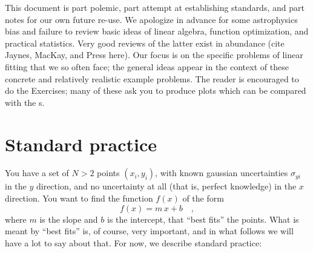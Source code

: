 \documentclass[12pt]{article}
\newcommand{\problemname}{Exercise}
\newcounter{problem}
\begin{document}
This document is part polemic, part attempt at establishing standards,
and part notes for our own future re-use.  We apologize in advance for
some astrophysics bias and failure to review basic ideas of linear
algebra, function optimization, and practical statistics.  Very good
reviews of the latter exist in abundance (cite Jaynes, MacKay, and
Press here).  Our focus is on the specific problems of linear fitting
that we so often face; the general ideas appear in the context of
these concrete and relatively realistic example problems.  The reader
is encouraged to do the \problemname s; many of these ask you to
produce plots which can be compared with the \figurename s.

\section{Standard practice}\label{sec:standard}

You have a set of $N>2$ points $(x_i,y_i)$, with known gaussian
uncertainties $\sigma_{yi}$ in the $y$ direction, and no uncertainty
at all (that is, perfect knowledge) in the $x$ direction.  You want to
find the function $f(x)$ of the form
\begin{equation}\label{eq:fofx}
f(x) = m\,x + b \quad ,
\end{equation}
where $m$ is the slope and $b$ is the intercept, that ``best fits''
the points.  What is meant by ``best fits'' is, of course, very
important, and in what follows we will have a lot to say about that.
For now, we describe standard practice:
\end{document}
